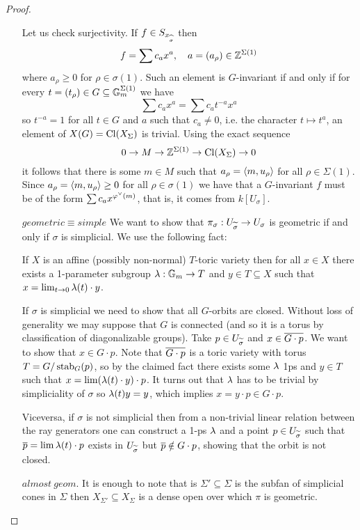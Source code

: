 \begin{proof}
\begin{itemize}
Let us check surjectivity. If $f\in S_{x_{\widehat{\sigma}}}$ then
\[f=\sum c_a x^a,\quad a=(a_\rho)\in \mathbb{Z}^{\Sigma(1)}\]
where $a_\rho\geq 0$ for $\rho\in \sigma(1)$. Such an element is $G$-invariant if and only if for every $t=(t_\rho)\in G\subseteq \mathbb{G}_m^{\Sigma(1)}$ we have
\[\sum c_a x^a=\sum c_a t^{-a}x^a\]
so $t^{-a}=1$ for all $t\in G$ and $a$ such that $c_a\neq 0$, i.e. the character $t\mapsto t^a$, an element of $X(G)=\operatorname{Cl}(X_\Sigma)$ is trivial. Using the exact sequence
\[0\to M\to \mathbb{Z}^{\Sigma(1)}\to \operatorname{Cl}(X_\Sigma)\to0\]
it follows that there is some $m\in M$ such that $a_\rho=\left\langle {m,u_\rho}\right\rangle$ for all $\rho\in \Sigma(1)$. Since $a_\rho=\left\langle {m,u_\rho}\right\rangle\geq 0$ for all $\rho\in \sigma(1)$ we have that a $G$-invariant $f$ must be of the form $\sum c_a x^{\varphi^\vee(m)}$, that is, it comes from $k[U_\sigma]$.
\item[$\boxed{geometric\equiv simple}$] We want to show that $\pi_\sigma:U_{\widetilde{\sigma}}\to U_\sigma$ is geometric if and only if $\sigma$ is simplicial. We use the following fact: 
\begin{center}
	If $X$ is an affine (possibly non-normal) $T$-toric variety then for all $x\in X$ there exists a 1-parameter subgroup $\lambda:\mathbb{G}_m\to T$ and $y\in T\subseteq X$ such that $x=\lim_{t\to 0}\lambda(t)\cdot y$.
\end{center}
If $\sigma$ is simplicial we need to show that all $G$-orbits are closed. Without loss of generality we may suppose that $G$ is connected (and so it is a torus by classification of diagonalizable groups). Take $p\in U_{\widetilde{\sigma}}$ and $x\in \overline{G\cdot p}$. We want to show that $x\in G\cdot p$. Note that $\overline{G\cdot p}$ is a toric variety with torus $T=G/\operatorname{stab}_G(p)$, so by the claimed fact there exists some $\lambda$ 1ps and $y\in T$ such that $x=\lim (\lambda(t)\cdot y)\cdot p$. It turns out that $\lambda$ has to be trivial by simpliciality of $\sigma$ so $\lambda(t)y=y$, which implies $x=y\cdot p\in G\cdot p$.

Viceversa, if $\sigma$ is not simplicial then from a non-trivial linear relation between the ray generators one can construct a 1-ps $\lambda$ and a point $p\in U_{\widetilde{\sigma}}$ such that $\overline{p}=\lim \lambda(t)\cdot p$ exists in $U_{\widetilde{\sigma}}$ but $\overline{p}\notin G\cdot p$, showing that the orbit is not closed.
\item[$\boxed{almost\ geom.}$] It is enough to note that is $\Sigma'\subseteq \Sigma$ is the subfan of simplicial cones in $\Sigma$ then $X_{\Sigma'}\subseteq X_\Sigma$ is a dense open over which $\pi$ is geometric.
\end{itemize}
\setlength{\leftmargini}{0.5cm}
\end{proof}


